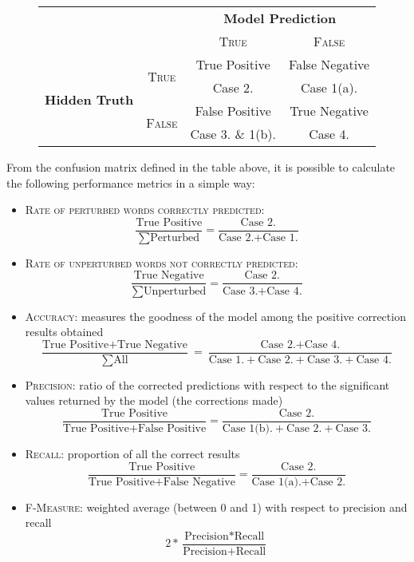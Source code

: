 \begin{figure}[H]
	\centering
	\begin{tabular}{lc|cc}
		\toprule
		& & \multicolumn{2}{c}{\textbf{Model Prediction}}\\
		& & \textsc{True}  & \textsc{False} \\
		\midrule
		\multirow{4}{*}{\textbf{Hidden Truth}} 
		& \multirow{2}{*}{\textsc{True}}   & True Positive & False Negative	\\ 
			& & Case 2. & Case 1(a).	\\ 
		& \multirow{2}{*}{\textsc{False}}  & False Positive & True Negative	\\
		& &  Case 3. \& 1(b).  & Case 4.	\\ 
		\bottomrule
	\end{tabular}
	\label{tab:confmat}
\end{figure}

From the confusion matrix defined in the table above, it is possible to calculate the following performance 
metrics in a simple way:
\begin{itemize}
	\item \textsc{Rate of perturbed words correctly predicted}:
	\[ \frac{\mbox{True Positive}}{\sum \mbox{Perturbed}} = \frac{\mbox{Case 2.}}{\mbox{Case 2.} + \mbox{Case 
	1.}}\]
	\item \textsc{Rate of unperturbed words not correctly predicted}:
	\[ \frac{\mbox{True Negative}}{\sum \mbox{Unperturbed}} = \frac{\mbox{Case 2.}}{\mbox{Case 3.} + 
	\mbox{Case 4.}}\]
	\item \textsc{Accuracy}: measures the goodness of the model among the positive correction results obtained
	\[ \frac{\mbox{True Positive} + \mbox{True Negative}}{\sum \mbox{All}} = \frac{\mbox{Case 2.} + \mbox{Case 
	4.}}{\mbox{Case 1.} + \mbox{Case 2.} + \mbox{Case 3.} + \mbox{Case 4.}}\]
	\item \textsc{Precision}: ratio of the corrected predictions with respect to the significant values returned by the 
	model (the corrections made) 
		\[ \frac{\mbox{True Positive}}{\mbox{True Positive} + \mbox{False Positive}} = \frac{\mbox{Case 
		2.}}{\mbox{Case 1(b).} + \mbox{Case 2.} + \mbox{Case 3.}}\]
	\item \textsc{Recall}: proportion of all the correct results
		\[ \frac{\mbox{True Positive}}{\mbox{True Positive} + \mbox{False Negative}} = \frac{\mbox{Case 
		2.}}{\mbox{Case 1(a).} + \mbox{Case 2.}}\]
	\item \textsc{F-Measure}: weighted average (between 0 and 1) with respect to precision and recall
			\[ 2 * \frac{\mbox{Precision} * \mbox{Recall}}{\mbox{Precision} + \mbox{Recall}} \]
\end{itemize}

